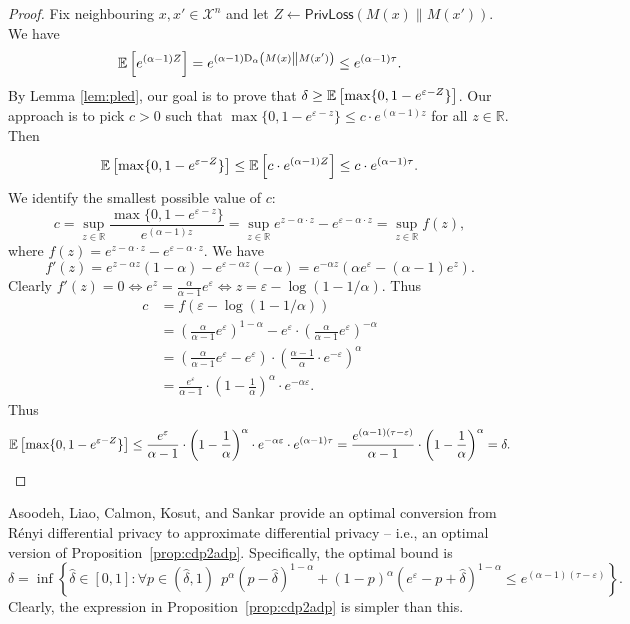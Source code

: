 \documentclass{jpc}
\newcommand{\ex}[2]{{\ifx&#1& \mathbb{E} \else
\underset{#1}{\mathbb{E}} \fi \left[#2\right]}}
\newcommand{\dr}[3]{\mathrm{D}_{#1}\left(#2\middle\|#3\right)}
\newcommand{\eps}{\varepsilon}
\newcommand{\privloss}[2]{\mathsf{PrivLoss}\left(#1\middle\|#2\right)}
\newcommand{\R}{\mathbb{R}}
\begin{document}
\begin{proof}






Fix neighbouring $x,x'\in\mathcal{X}^n$ and let $Z \gets \privloss{M(x)}{M(x')}$. We have $$\ex{}{e^{(\alpha-1)Z}} =e^{(\alpha-1)\dr{\alpha}{M(x)}{M(x')}}\le e^{(\alpha-1)\tau}.$$
By Lemma \ref{lem:pled}, our goal is to prove that $\delta \ge \ex{}{\max\{0,1-e^{\eps-Z}\}}$.
Our approach is to pick $c>0$ such that $\max\{0,1-e^{\eps-z}\} \le c \cdot e^{(\alpha-1)z}$ for all $z \in \R$. Then $$\ex{}{\max\{0,1-e^{\eps-Z}\}} \le \ex{}{c \cdot e^{(\alpha-1)Z}} \le c \cdot e^{(\alpha-1)\tau}.$$
We identify the smallest possible value of $c$: $$c = \sup_{z \in \R} \frac{\max\{0,1-e^{\eps-z}\}}{e^{(\alpha-1)z}} = \sup_{z \in \R} e^{z -\alpha \cdot z} - e^{\eps-\alpha \cdot z} = \sup_{z \in \R} f(z),$$ where $f(z) = e^{z -\alpha \cdot z} - e^{\eps-\alpha \cdot z}$. We have $$f'(z) = e^{z-\alpha z}(1-\alpha) - e^{\eps - \alpha z}(-\alpha) = e^{-\alpha z} (\alpha e^\eps - (\alpha-1)e^z).$$ Clearly $f'(z)=0 \iff e^z = \frac{\alpha}{\alpha-1}e^\eps \iff z = \eps - \log(1-1/\alpha)$. Thus \begin{align*}
    c&=f(\eps-\log(1-1/\alpha))\\
    &= \left(\frac{\alpha}{\alpha-1}e^\eps\right)^{1-\alpha} - e^\eps \cdot \left(\frac{\alpha}{\alpha-1}e^\eps\right)^{-\alpha}\\
    &= \left(\frac{\alpha}{\alpha-1}e^\eps - e^\eps\right) \cdot \left(\frac{\alpha-1}{\alpha}\cdot e^{-\eps}\right)^\alpha\\
    &= \frac{e^\eps}{\alpha-1} \cdot \left(1-\frac{1}{\alpha}\right)^\alpha \cdot e^{-\alpha\eps}.
\end{align*} 
Thus 
\[
  \ex{}{\max\{0,1-e^{\eps-Z}\}} \le \frac{e^\eps}{\alpha-1} \cdot \left(1-\frac{1}{\alpha}\right)^\alpha \cdot e^{-\alpha\eps} \cdot e^{(\alpha-1)\tau} 
  = \frac{e^{(\alpha-1)(\tau-\eps)}}{\alpha-1} \cdot \left(1-\frac{1}{\alpha}\right)^\alpha 
  = \delta.
\]
\end{proof}

Asoodeh, Liao, Calmon, Kosut, and Sankar \cite{AsoodehLCKS20} provide an optimal conversion from R\'enyi differential privacy to approximate differential privacy -- i.e., an optimal version of Proposition~\ref{prop:cdp2adp}. Specifically, the optimal bound is
\begin{equation}
    \delta = \inf \left\{ \hat\delta \in [0,1] : \forall p \in (\hat\delta,1) ~~ p^\alpha(p-\hat\delta)^{1-\alpha} + (1-p)^\alpha(e^\eps-p+\hat\delta)^{1-\alpha} \le e^{(\alpha-1)(\tau -\eps)} \right\}.
\end{equation} Clearly, the expression in Proposition~\ref{prop:cdp2adp} is simpler than this. 
\end{document}
